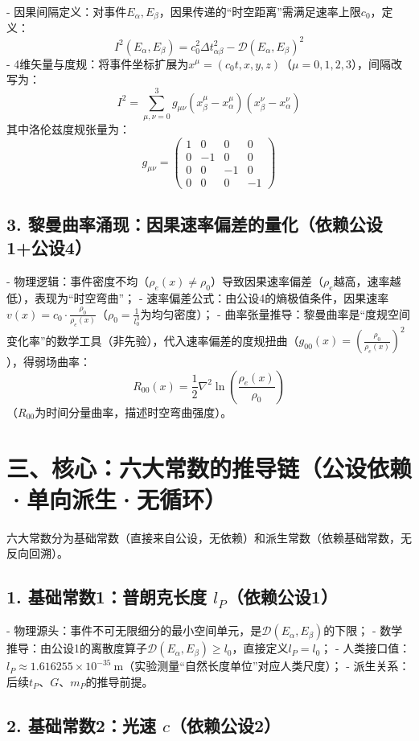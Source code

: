 \documentclass{article}
\begin{document}
- 因果间隔定义：对事件$E_\alpha,E_\beta$，因果传递的“时空距离”需满足速率上限$c_0$，定义：
\[
I^2(E_\alpha,E_\beta) = c_0^2 \Delta t_{\alpha\beta}^2 - \mathcal{D}(E_\alpha,E_\beta)^2
\]
- 4维矢量与度规：将事件坐标扩展为$x^\mu=(c_0 t, x, y, z)$（$\mu=0,1,2,3$），间隔改写为：
\[
I^2 = \sum_{\mu,\nu=0}^3 g_{\mu\nu}(x^\mu_\beta - x^\mu_\alpha)(x^\nu_\beta - x^\nu_\alpha)
\]
其中洛伦兹度规张量为：
\[
g_{\mu\nu} = \begin{pmatrix}1&0&0&0\\0&-1&0&0\\0&0&-1&0\\0&0&0&-1\end{pmatrix}
\]

\subsection*{3. 黎曼曲率涌现：因果速率偏差的量化（依赖公设1+公设4）}

- 物理逻辑：事件密度不均（$\rho_e(x) \neq \rho_0$）导致因果速率偏差（$\rho_e$越高，速率越低），表现为“时空弯曲”；
- 速率偏差公式：由公设4的熵极值条件，因果速率$v(x) = c_0 \cdot \frac{\rho_0}{\rho_e(x)}$（$\rho_0=\frac{1}{l_0^3}$为均匀密度）；
- 曲率张量推导：黎曼曲率是“度规空间变化率”的数学工具（非先验），代入速率偏差的度规扭曲（$g_{00}(x)=\left(\frac{\rho_0}{\rho_e(x)}\right)^2$），得弱场曲率：
\[
R_{00}(x) = \frac{1}{2} \nabla^2 \ln\left(\frac{\rho_e(x)}{\rho_0}\right)
\]
（$R_{00}$为时间分量曲率，描述时空弯曲强度）。

\section*{三、核心：六大常数的推导链（公设依赖·单向派生·无循环）}

六大常数分为基础常数（直接来自公设，无依赖）和派生常数（依赖基础常数，无反向回溯）。

\subsection*{1. 基础常数1：普朗克长度 $l_P$（依赖公设1）}

- 物理源头：事件不可无限细分的最小空间单元，是$\mathcal{D}(E_\alpha,E_\beta)$的下限；
- 数学推导：由公设1的离散度算子$\mathcal{D}(E_\alpha,E_\beta) \geq l_0$，直接定义$l_P = l_0$；
- 人类接口值：$l_P \approx 1.616255 \times 10^{-35}\ \text{m}$（实验测量“自然长度单位”对应人类尺度）；
- 派生关系：后续$t_P$、$G$、$m_P$的推导前提。

\subsection*{2. 基础常数2：光速 $c$（依赖公设2）}
\end{document}
